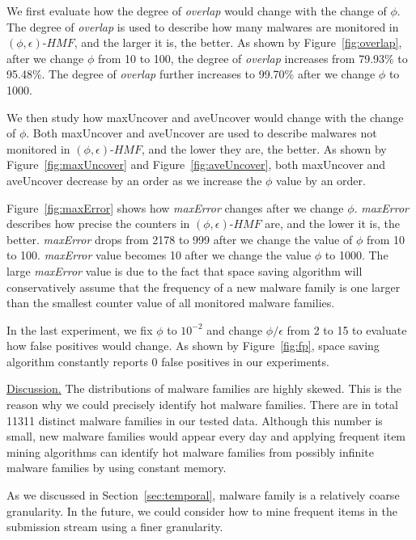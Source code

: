 We first evaluate how the degree of \textit{overlap} would change with the change of $\phi$. 
The degree of \textit{overlap} is used to describe how many malwares are monitored in $(\phi, \epsilon)\mbox{-}HMF$, and the larger it is, the better. 
As shown by Figure~\ref{fig:overlap}, after we change $\phi$ from 10 to 100, the degree of \textit{overlap} increases from 79.93\% to 95.48\%. 
The degree of \textit{overlap} further increases to 99.70\% after we change $\phi$ to 1000. 

We then study how maxUncover and aveUncover would change with the change of $\phi$.
Both maxUncover and aveUncover are used to describe malwares not monitored in $(\phi, \epsilon)\mbox{-}HMF$, 
and the lower they are, the better. 
As shown by Figure~\ref{fig:maxUncover} and Figure~\ref{fig:aveUncover}, 
both maxUncover and aveUncover decrease by an order as we increase the $\phi$ value by an order. 

Figure~\ref{fig:maxError} shows how \textit{maxError} changes after we change $\phi$. 
\textit{maxError} describes how precise the counters in $(\phi, \epsilon)\mbox{-}HMF$ are, 
and the lower it is, the better. \textit{maxError} drops from 2178 to 999 
after we change the value of $\phi$ from 10 to 100. 
\textit{maxError} value becomes 10 after we change the value $\phi$ to 1000. 
The large \textit{maxError} value is due to the fact that space saving algorithm 
will conservatively assume that the frequency of a new malware family is one larger than the smallest counter value of all monitored malware families. 

In the last experiment, we fix $\phi$ to $10^{-2}$ 
and change $\phi/\epsilon$ from 2 to 15 to evaluate how false positives would change. 
As shown by Figure~\ref{fig:fp}, space saving algorithm constantly reports 0 false positives in our experiments. 

\underline{Discussion.}
The distributions of malware families are highly skewed. 
This is the reason why we could precisely identify hot malware families. 
There are in total 11311 distinct malware families in our tested data. 
Although this number is small, new malware families would appear every day 
and applying frequent item mining algorithms can identify hot malware families from possibly 
infinite malware families by using constant memory. 

As we discussed in Section~\ref{sec:temporal}, malware family is a relatively coarse granularity.
In the future, we could consider how to mine frequent items in the submission stream using a finer granularity. 

